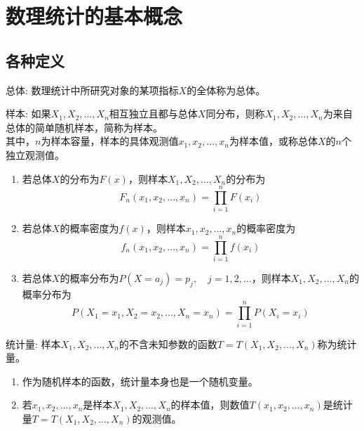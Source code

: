 \section{数理统计的基本概念}

\subsection{各种定义}
\begin{defination}
	总体: 数理统计中所研究对象的某项指标$X$的全体称为总体。
\end{defination}
\begin{defination}
	样本: 如果$X_1, X_2, \dots, X_n$相互独立且都与总体$X$同分布，则称$X_1, X_2, \dots, X_n$为来自总体的简单随机样本，简称为样本。\\
	其中，$n$为样本容量，样本的具体观测值$x_1, x_2, \dots, x_n$为样本值，或称总体$X$的$n$个独立观测值。
\end{defination}
\begin{enumerate}
	\item 若总体$X$的分布为$F(x)$，则样本$X_1, X_2, \dots, X_n$的分布为
	\begin{equation}
		F_n(x_1, x_2, \dots, x_n) = \prod_{i=1}^{n}F(x_i)
	\end{equation}

	\item 若总体$X$的概率密度为$f(x)$，则样本$x_1, x_2, \dots, x_n$的概率密度为
	\begin{equation}
		f_n(x_1, x_2, \dots, x_n) = \prod_{i=1}^{n}f(x_i)
	\end{equation}
	\item 若总体$X$的概率分布为$P(X=a_j)=p_j, \quad j = 1,2, \dots$，则样本$X_1, X_2, \dots, X_n$的概率分布为
	\begin{equation}
		P(X_1=x_1, X_2=x_2, \dots, X_n=x_n) = \prod_{i=1}^{n}P(X_i = x_i)
	\end{equation}
\end{enumerate}
\begin{defination}
	统计量: 样本$X_1, X_2, \dots, X_n$的不含未知参数的函数$T = T(X_1, X_2, \dots, X_n)$称为统计量。
\end{defination}
\begin{enumerate}
	\item 作为随机样本的函数，统计量本身也是一个随机变量。
	\item 若$x_1, x_2, \dots, x_n$是样本$X_1, X_2, \dots, X_n$的样本值，则数值$T(x_1, x_2, \dots, x_n)$是统计量$T = T(X_1, X_2, \dots, X_n)$的观测值。
\end{enumerate}


